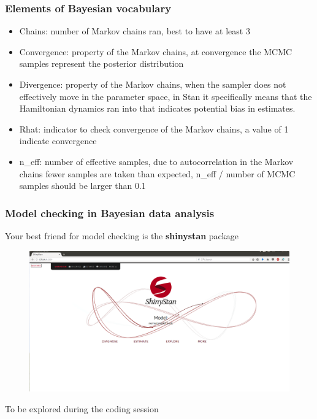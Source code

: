 \documentclass{beamer}
\begin{document}
   
  \begin{frame}
  \frametitle{\bf Elements of Bayesian vocabulary}
  
   \begin{itemize}
   \item Chains: number of Markov chains ran, best to have at least 3
   \item Convergence: property of the Markov chains, at convergence the MCMC samples represent the posterior distribution
   \item Divergence: property of the Markov chains, when the sampler does not effectively move in the parameter space, in Stan it specifically means that the Hamiltonian dynamics ran into that indicates potential bias in estimates.
   \item Rhat: indicator to check convergence of the Markov chains, a value of 1 indicate convergence
   \item n\_eff: number of effective samples, due to autocorrelation in the Markov chains fewer samples are taken than expected, n\_eff / number of MCMC samples should be larger than 0.1
  \end{itemize}

  
 \end{frame}
 
  \begin{frame}
  \frametitle{\bf Model checking in Bayesian data analysis}
  
  Your best friend for model checking is the \textbf{shinystan} package
  
  \begin{figure}
   \includegraphics[width=\textwidth,height=.7\textheight,keepaspectratio]{shiny.png}
  \end{figure}
  
  To be explored during the coding session

  
 \end{frame}
 
\end{document}
